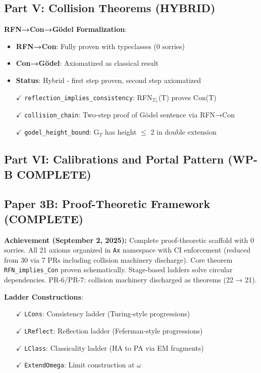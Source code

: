 \documentclass[11pt]{article}
\theoremstyle{definition}
\theoremstyle{remark}
\begin{document}
\subsection{Part V: Collision Theorems (HYBRID)}

\textbf{RFN→Con→Gödel Formalization}:
\begin{itemize}
\item \textbf{RFN→Con}: Fully proven with typeclasses (0 sorries)
\item \textbf{Con→Gödel}: Axiomatized as classical result
\item \textbf{Status}: Hybrid - first step proven, second step axiomatized
\item[$\checkmark$] \texttt{reflection\_implies\_consistency}: RFN$_{\Sigma_1}$(T) proves Con(T) 
\item[$\checkmark$] \texttt{collision\_chain}: Two-step proof of Gödel sentence via RFN→Con
\item[$\checkmark$] \texttt{godel\_height\_bound}: G$_T$ has height $\leq$ 2 in double extension
\end{itemize}

\subsection{Part VI: Calibrations and Portal Pattern (WP-B COMPLETE)}

\subsection{Paper 3B: Proof-Theoretic Framework (COMPLETE)}

\begin{mdframed}[style=achievement]
\textbf{Achievement (September 2, 2025):} Complete proof-theoretic scaffold with 0 sorries. All 21 axioms organized in \texttt{Ax} namespace with CI enforcement (reduced from 30 via 7 PRs including collision machinery discharge). Core theorem \texttt{RFN\_implies\_Con} proven schematically. Stage-based ladders solve circular dependencies. PR-6/PR-7: collision machinery discharged as theorems (22 → 21).
\end{mdframed}

\textbf{Ladder Constructions}:
\begin{itemize}
\item[$\checkmark$] \texttt{LCons}: Consistency ladder (Turing-style progressions)
\item[$\checkmark$] \texttt{LReflect}: Reflection ladder (Feferman-style progressions)  
\item[$\checkmark$] \texttt{LClass}: Classicality ladder (HA to PA via EM fragments)
\item[$\checkmark$] \texttt{ExtendOmega}: Limit construction at $\omega$
\end{itemize}
\end{document}

